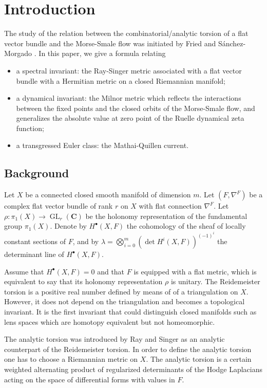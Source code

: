 \documentclass[11pt]{article}
\numberwithin{equation}{section}
\newcommand{\sbullet}{{\scriptscriptstyle\bullet}}
\theoremstyle{plain}
\theoremstyle{definition}
\theoremstyle{remark}
\newcommand{\bC}{\mathbf{C}}
\DeclareMathOperator{\GL}{GL}
\begin{document}
\section*{Introduction}
The study of the relation between the combinatorial/analytic torsion of
a flat vector bundle and the Morse-Smale flow was initiated by Fried \cite{Friedconj} and
Sánchez-Morgado \cite{MorgadoMorseSmale}.
In this paper, we give a formula relating
\begin{itemize}
\item a spectral invariant: the Ray-Singer metric associated
with a flat vector bundle with a Hermitian metric on a closed Riemannian
manifold;
\item a dynamical invariant: the Milnor metric which reflects
the interactions between the fixed points and the
closed orbits of the Morse-Smale flow, and generalizes the
absolute value at zero point of the Ruelle dynamical zeta function;
\item a transgressed Euler class:
the Mathai-Quillen current.
\end{itemize}

\subsection{Background}
Let $X$ be a connected closed smooth manifold of dimension $m$. Let
$(F,\nabla^{F})$ be a complex
flat vector bundle of rank $r$ on $X$ with flat connection
$\nabla^{F}$. Let $\rho: \pi_1(X)\rightarrow \GL_r(\bC)$ be the
holonomy representation of the
fundamental group $\pi_1(X)$.
Denote by $H^\sbullet(X,F)$ the cohomology of
the sheaf of locally constant sections of $F$, and by
$\lambda=\bigotimes_{i=0}^{m}(\det H^{i}(X,F))^{(-1)^{i}}$ the
determinant line of $H^{\sbullet}(X,F)$.

{Assume that $H^{\sbullet}(X,F)=0$ and that $F$ is equipped
with a flat metric, which is equivalent to say that its holonomy
representation $\rho$ is unitary.
The Reidemeister torsion \cite{ReidemeisterTorsion,FranzTorsion,dRTorsion} is a positive real number
defined by means of of a triangulation on $X$. However, it does not depend on the
triangulation and becomes a topological invariant. It is the first
invariant that could distinguish closed manifolds such as lens spaces
which are homotopy equivalent but not homeomorphic.}

The analytic torsion was introduced by Ray and Singer
\cite{RSTorsion} as an analytic counterpart of the Reidemeister torsion.
In order to define the analytic torsion one has to choose a
Riemannian metric on $X$. The analytic torsion is a certain
weighted alternating product of regularized determinants of the Hodge
Laplacians acting on the space of differential forms with values in
$F$.
\end{document}
